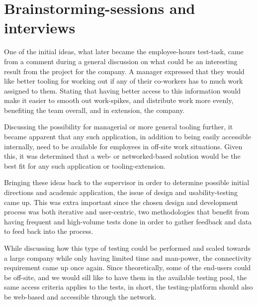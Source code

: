 \section{Brainstorming-sessions and interviews}{\label{label_sectionIdeas}

%

One of the initial ideas, what later became the employee-hours test-task, came
from a comment during a general discussion on what could be an interesting
result from the project for the company. A manager expressed that they would
like better tooling for working out if any of their co-workers has to much work
assigned to them. Stating that having better access to this information would
make it easier to smooth out work-spikes, and distribute work more evenly,
benefiting the team overall, and in extension, the company.

Discussing the possibility for managerial or more general tooling further, it
became apparent that any such application, in addition to being easily
accessible internally, need to be available for employees in off-site work
situations. Given this, it was determined that a web- or networked-based
solution would be the best fit for any such application or tooling-extension.

Bringing these ideas back to the supervisor in order to determine possible
initial directions and academic application, the issue of design and
usability-testing came up. This was extra important since the
chosen design and development process was both iterative and user-centric, two
methodologies that benefit from having frequent and high-volume tests done in
order to gather feedback and data to feed back into the process.

While discussing how this type of testing could be performed and scaled towards
a large company while only having limited time and man-power, the connectivity
requirement came up once again. Since theoretically, some of the end-users
could be off-site, and we would sill like to have them in the available testing
pool, the same access criteria applies to the tests, in short, the
testing-platform should also be web-based and accessible through the network.

}

